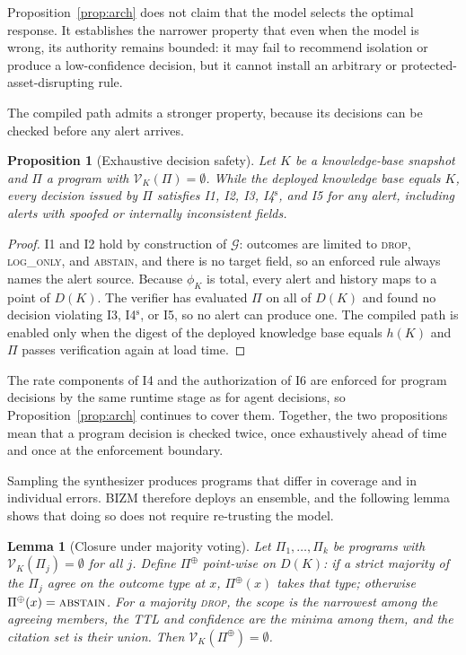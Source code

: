 \documentclass[final,5p]{elsarticle}
\newtheorem{proposition}{Proposition}
\newtheorem{lemma}{Lemma}
\begin{document}
Proposition~\ref{prop:arch} does not claim that the model selects the optimal response. It establishes the narrower property that even when the model is wrong, its authority remains bounded: it may fail to recommend isolation or produce a low-confidence decision, but it cannot install an arbitrary or protected-asset-disrupting rule.

The compiled path admits a stronger property, because its decisions can be checked before any alert arrives.

\begin{proposition}[Exhaustive decision safety]
\label{prop:exhaustive}
Let $K$ be a knowledge-base snapshot and $\Pi$ a program with $\mathcal{V}_K(\Pi)=\emptyset$. While the deployed knowledge base equals $K$, every decision issued by $\Pi$ satisfies I1, I2, I3, I4$^{\mathrm{s}}$, and I5 for any alert, including alerts with spoofed or internally inconsistent fields.
\end{proposition}

\begin{proof}
I1 and I2 hold by construction of $\mathcal{G}$: outcomes are limited to \textsc{drop}, \textsc{log\_only}, and \textsc{abstain}, and there is no target field, so an enforced rule always names the alert source. Because $\phi_K$ is total, every alert and history maps to a point of $D(K)$. The verifier has evaluated $\Pi$ on all of $D(K)$ and found no decision violating I3, I4$^{\mathrm{s}}$, or I5, so no alert can produce one. The compiled path is enabled only when the digest of the deployed knowledge base equals $h(K)$ and $\Pi$ passes verification again at load time.
\end{proof}

The rate components of I4 and the authorization of I6 are enforced for program decisions by the same runtime stage as for agent decisions, so Proposition~\ref{prop:arch} continues to cover them. Together, the two propositions mean that a program decision is checked twice, once exhaustively ahead of time and once at the enforcement boundary.

Sampling the synthesizer produces programs that differ in coverage and in individual errors. BIZM therefore deploys an ensemble, and the following lemma shows that doing so does not require re-trusting the model.

\begin{lemma}[Closure under majority voting]
\label{lem:ensemble}
Let $\Pi_1,\ldots,\Pi_k$ be programs with $\mathcal{V}_K(\Pi_j)=\emptyset$ for all $j$. Define $\Pi^{\oplus}$ point-wise on $D(K)$: if a strict majority of the $\Pi_j$ agree on the outcome type at $x$, $\Pi^{\oplus}(x)$ takes that type; otherwise $\Pi^{\oplus}(x)=\textsc{abstain}$. For a majority \textsc{drop}, the scope is the narrowest among the agreeing members, the TTL and confidence are the minima among them, and the citation set is their union. Then $\mathcal{V}_K(\Pi^{\oplus})=\emptyset$.
\end{lemma}
\end{document}
